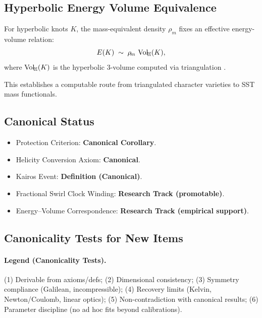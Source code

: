 \subsection{Hyperbolic Energy Volume Equivalence}

\begin{axiom}
    For hyperbolic knots $K$, the mass-equivalent density $\rho_{\!m}$ fixes an effective energy-volume relation:
    \[
        E(K) \;\sim\; \rho_{\!m}\,\operatorname{Vol}_{\!\mathbb{H}}(K),
    \]
    where $\operatorname{Vol}_{\!\mathbb{H}}(K)$ is the hyperbolic 3-volume computed via triangulation \cite{Purcell2025,Petersen2024}.
\end{axiom}

This establishes a computable route from triangulated character varieties to SST mass functionals.

\subsection{Canonical Status}

\begin{itemize}
    \item Protection Criterion: \textbf{Canonical Corollary}.
    \item Helicity Conversion Axiom: \textbf{Canonical}.
    \item Kairos Event: \textbf{Definition (Canonical)}.
    \item Fractional Swirl Clock Winding: \textbf{Research Track (promotable)}.
    \item Energy–Volume Correspondence: \textbf{Research Track (empirical support)}.
\end{itemize}

\subsection{Canonicality Tests for New Items}
\label{app:knot_protection:tests}

\paragraph{Legend (Canonicality Tests).}
(1) Derivable from axioms/defs; (2) Dimensional consistency; (3) Symmetry compliance (Galilean, incompressible);
    (4) Recovery limits (Kelvin, Newton/Coulomb, linear optics); (5) Non-contradiction with canonical results;
    (6) Parameter discipline (no ad hoc fits beyond calibrations).

